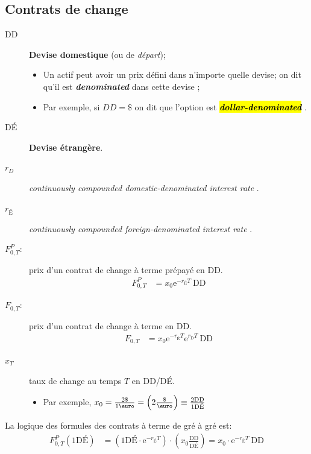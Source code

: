 \documentclass[10pt, french]{article}
\begin{document}
\begin{multicols*}{2}
\subsection{Contrats de change}
\begin{distributions}
\begin{description}
	\item[DD] \textbf{Devise domestique} (ou de \textit{départ});
		\begin{itemize}
		\item	Un actif peut avoir un prix défini dans n'importe quelle devise; on dit qu'il est \og \textit{\textbf{denominated}} \fg{} dans cette devise ; 
		\item	Par exemple, si $DD	=	\$$ on dit que l'option est \og \hl{\textit{\textbf{dollar-denominated}}} \fg{}.
		\end{itemize}
	\item[DÉ] \textbf{Devise étrangère}.
	\item[$r_{D}$]	\og \textit{continuously compounded domestic-denominated interest rate} \fg{}.
	\item[$r_{\text{É}}$]	\og \textit{continuously compounded foreign-denominated interest rate} \fg{}.
	\item[$F_{0, T}^{P}$:]	prix d'un contrat de change à terme prépayé en DD.
	\begin{align*}
	F_{0, T}^{P} 
	&= x_{0}\textrm{e}^{-r_{\text{É}}T}\ \text{DD}
	\end{align*}		
	\item[$F_{0, T}$:]	prix d'un contrat de change à terme en DD.
	\begin{align*}
	F_{0, T} 
	&= x_{0}\textrm{e}^{-r_{\text{É}}T} \textrm{e}^{r_{\text{D}}T}\ \text{DD}	
	\end{align*}		
	\item[$x_{T}$]	taux de change au temps $T$ en DD/DÉ.
		\begin{itemize}
		\item	Par exemple, $x_{0} = \frac{2\$}{\text{1\euro}} = \left(2 \frac{\$}{\text{\euro}}\right) \equiv \frac{2\text{DD}}{1\text{DÉ}}$
		\end{itemize}
\end{description}

La logique des formules des contrats à terme de gré à gré est:
\begin{align*}
	F_{0, T}^{P}(1 \text{DÉ})
	&=	\left(1\text{DÉ} \cdot \textrm{e}^{-r_{\text{É}}T}\right) \cdot \left(x_{0} \frac{\text{DD}}{\text{DÉ}} \right)	
	=	x_{0} \cdot \textrm{e}^{-r_{\text{É}}T}\ \text{DD}
\end{align*}
\end{distributions}



\end{multicols*}
\end{document}
